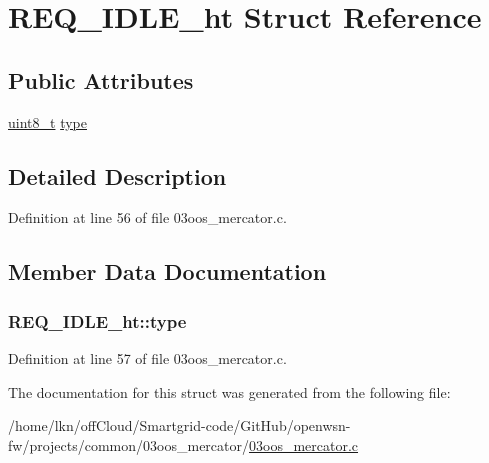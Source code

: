 \hypertarget{struct_r_e_q___i_d_l_e__ht}{}\section{R\+E\+Q\+\_\+\+I\+D\+L\+E\+\_\+ht Struct Reference}
\label{struct_r_e_q___i_d_l_e__ht}
\subsection*{Public Attributes}
\begin{DoxyCompactItemize}
\item 
\hyperlink{_p_e___types_8h_aba7bc1797add20fe3efdf37ced1182c5}{uint8\+\_\+t} \hyperlink{struct_r_e_q___i_d_l_e__ht_a9eef94e8cc0f13b5bb492f3d4f6ca727}{type}
\end{DoxyCompactItemize}


\subsection{Detailed Description}


Definition at line 56 of file 03oos\+\_\+mercator.\+c.



\subsection{Member Data Documentation}
\subsubsection[{\texorpdfstring{type}{type}}]{ R\+E\+Q\+\_\+\+I\+D\+L\+E\+\_\+ht\+::type}\hypertarget{struct_r_e_q___i_d_l_e__ht_a9eef94e8cc0f13b5bb492f3d4f6ca727}{}\label{struct_r_e_q___i_d_l_e__ht_a9eef94e8cc0f13b5bb492f3d4f6ca727}


Definition at line 57 of file 03oos\+\_\+mercator.\+c.



The documentation for this struct was generated from the following file\+:\begin{DoxyCompactItemize}
\item 
/home/lkn/off\+Cloud/\+Smartgrid-\/code/\+Git\+Hub/openwsn-\/fw/projects/common/03oos\+\_\+mercator/\hyperlink{03oos__mercator_8c}{03oos\+\_\+mercator.\+c}\end{DoxyCompactItemize}
